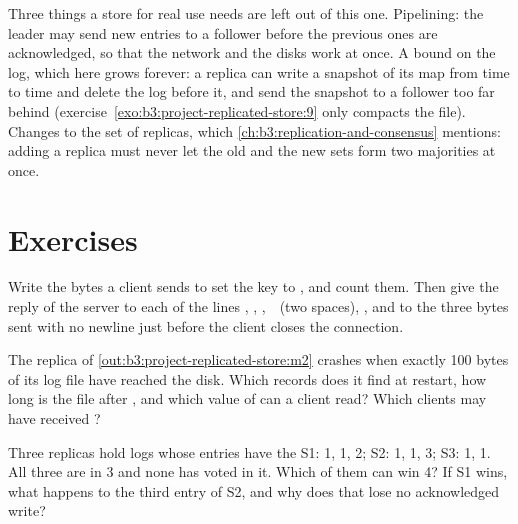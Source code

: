 \begin{inpractice}
Three things a store for real use needs are left out of this one. Pipelining: the leader may send new entries to a follower before the previous ones are acknowledged, so that the network and the disks work at once. A bound on the log, which here grows forever: a replica can write a snapshot of its map from time to time and delete the log before it, and send the snapshot to a follower too far behind (exercise~\ref{exo:b3:project-replicated-store:9} only compacts the file). Changes to the set of replicas, which \cref{ch:b3:replication-and-consensus} mentions: adding a replica must never let the old and the new sets form two majorities at once.
\end{inpractice}

\section{Exercises}\label{sec:b3:project-replicated-store:exercises}

\begin{exercise}[$\star$]\label{exo:b3:project-replicated-store:1}
Write the bytes a client sends to set the key  to , and count them. Then give the reply of the server to each of the lines , , , \,\textvisiblespace\,\textvisiblespace{} (two spaces), , and to the three bytes  sent with no newline just before the client closes the connection.
\end{exercise}

\begin{exercise}[$\star$]\label{exo:b3:project-replicated-store:2}
The replica of \cref{out:b3:project-replicated-store:m2} crashes when exactly 100 bytes of its log file have reached the disk. Which records does it find at restart, how long is the file after , and which value of  can a client read? Which clients may have received ?
\end{exercise}

\begin{exercise}[$\star$]\label{exo:b3:project-replicated-store:3}
Three replicas hold logs whose entries have the  S1: 1, 1, 2; S2: 1, 1, 3; S3: 1, 1. All three are in  3 and none has voted in it. Which of them can win  4? If S1 wins, what happens to the third entry of S2, and why does that lose no acknowledged write?
\end{exercise}

